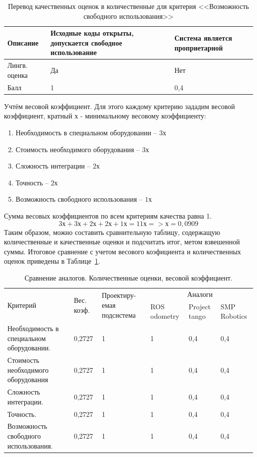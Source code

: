 \begin{table}[!htb]
	\caption{Перевод качественных оценок в количественные для критерия 
  <<Возможность свободного использования>>}
    \centering
	\begin{tabular}{|p{3cm}|p{6cm}|p{6cm}|}
	\hline 
	Описание & 
	Исходные коды открыты, допускается свободное использование & 
	Система является проприетарной \\ 
	\hline 
	Лингв. оценка & Да & Нет \\ 
	\hline 
	Балл & 1 & 0,4 \\ 
	\hline 
	\end{tabular} 
\end{table} 

Учтём весовой коэффициент. Для этого каждому критерию зададим весовой коэффициент, кратный х - минимальному весовому коэффициенту:
\begin{enumerate}
\item Необходимость в специальном оборудовании – $3х$
\item Стоимость необходимого оборудования – $3х$
\item Сложность интеграции – $2х$
\item Точность – $2х$
\item Возможность свободного использования – $1х$
\end{enumerate}

Сумма весовых коэффициентов по всем критериям качества равна 1.
$$3х + 3х + 2х + 2х + 1х = 11х => х = 0,0909$$
Таким образом, можно составить сравнительную таблицу, содержащую количественные и качественные оценки и подсчитать итог, метом взвешенной суммы.
Итоговое сравнение с учетом весового коэфициента и количественных оценок приведены в Таблице~\ref{tab:srav_ves}.

\begin{table}[!Htb]
	\caption{Сравнение аналогов. Количественные оценки, весовой коэффициент.}\label{tab:srav_ves}
    \centering
	\begin{tabular}{|p{4cm}|p{2cm}|p{}|p{2cm}|p{2cm}|p{2cm}|}
	\hline 
	\multirow{2}{4cm}{Критерий} & \multirow{2}{2cm}{Вес. коэф. } & \multirow{2}{2,5cm}{Проектиру-емая подсистема} & 	\multicolumn{3}{c|}{Аналоги}\\ 
	\cline{4-6}
	 &  &   & ROS odometry & Project tango & SMP Robotics \\ 
	\hline 
	Необходимость в специальном оборудовании. & 0,2727 & 1 & 1 & 0,4 & 0,4 \\ 
	\hline 
	Стоимость необходимого оборудования & 0,2727 & 1 & 1 & 0,4 & 0,4 \\ 	
	\hline 
	Сложность интеграции. & 0,2727 & 1 & 1 & 0,4 & 0,4 \\
	\hline 
	Точность. & 0,2727 & 1 & 1 & 0,4 & 0,4 \\ 
	\hline 
	Возможность свободного использования. & 0,2727 & 1 & 1 & 0,4 & 0,4 \\ 
	\hline 
	\end{tabular}
\end{table} 


